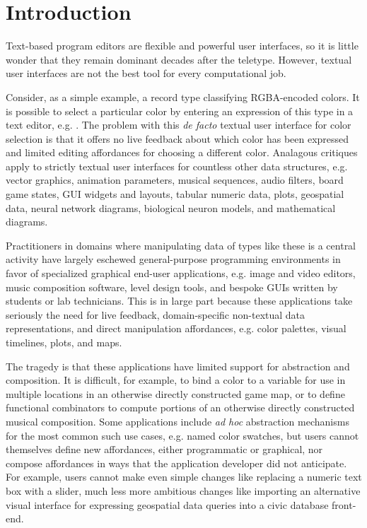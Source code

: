 \section{Introduction}\label{sec:intro}
Text-based program editors are flexible and powerful user interfaces, 
so it is little wonder that they remain dominant decades after the teletype.
However, textual user interfaces are not the best tool for every computational job.

Consider, as a simple example, a record type
classifying RGBA-encoded colors. 
It is possible to select a particular color by entering
an expression of this type in a text editor, e.g. . 
The problem with this \emph{de facto} textual user interface for color selection is that 
it offers no live feedback about which color has been expressed 
and limited editing affordances for choosing a different color.
Analagous critiques apply to strictly textual user interfaces for 
countless other data structures,
e.g. vector graphics,
animation parameters,
musical sequences,
audio filters,
board game states, 
GUI widgets and layouts,
tabular numeric data, 
plots,
geospatial data, 
neural network diagrams, 
biological neuron models, 
and mathematical diagrams.

Practitioners in domains where manipulating data of types like these is 
a central activity 
have largely eschewed general-purpose programming environments 
in favor of specialized graphical end-user applications, e.g. %
image and video editors, music composition software, level design tools, 
and bespoke GUIs written by students or lab technicians.
This is in large part because these applications 
take seriously the need for live feedback, domain-specific 
non-textual data representations, and 
direct manipulation affordances, 
e.g. color palettes, visual timelines, plots, and maps.

The tragedy is that these applications have 
limited support for abstraction and composition.
It is difficult, for example, to bind a
color to a variable for use in multiple locations in an
otherwise directly constructed game map, 
or to define functional combinators to compute portions of an 
otherwise directly constructed musical composition. 
Some applications include \emph{ad hoc} abstraction mechanisms for 
the most common such use cases, e.g. named color swatches, 
but users cannot themselves define new affordances, either programmatic or graphical, 
nor compose
affordances in ways that the application developer did not anticipate.
For example, 
users cannot make even simple changes like replacing a 
numeric text box with a slider,
much less more ambitious changes like importing an alternative 
visual interface for expressing geospatial data queries 
into a civic database front-end. 

